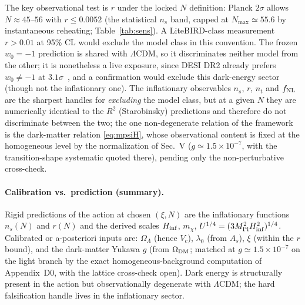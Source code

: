 \documentclass[pdflatex,sn-mathphys-num]{sn-jnl}
\newcommand{\MP}{M_{\rm Pl}}
\theoremstyle{thmstyleone}
\begin{document}
The key observational test is $r$ under the locked $N$ definition: Planck $2\sigma$ allows $N\approx45$--$56$ with $r\leq0.0052$ (the statistical $n_s$ band, capped at $N_{\max}\simeq55.6$ by instantaneous reheating; Table~\ref{tab:sens}). A LiteBIRD-class measurement $r>0.01$ at 95\% CL would exclude the model class in this convention. The frozen $w_0=-1$ prediction is shared with $\Lambda$CDM, so it discriminates neither model from the other; it is nonetheless a live exposure, since DESI DR2 already prefers $w_0\neq-1$ at $3.1\sigma$~\cite{DESI2025}, and a confirmation would exclude this dark-energy sector (though not the inflationary one). The inflationary observables $n_s$, $r$, $n_t$ and $f_{\rm NL}$ are the sharpest handles for \emph{excluding} the model class, but at a given $N$ they are numerically identical to the $R^2$ (Starobinsky) predictions and therefore do not discriminate between the two; the one non-degenerate relation of the framework is the dark-matter relation \eqref{eq:mpsiH}, whose observational content is fixed at the homogeneous level by the normalization of Sec.~V ($g\simeq1.5\times10^{-7}$, with the transition-shape systematic quoted there), pending only the non-perturbative cross-check.

\paragraph{Calibration vs.\ prediction (summary).} Rigid predictions of the action at chosen $(\xi,N)$ are the inflationary functions $n_s(N)$ and $r(N)$ and the derived scales $H_{\rm inf}$, $m_\chi$, $U^{1/4}=(3\MP^2H_{\rm inf}^2)^{1/4}$. Calibrated or a-posteriori inputs are: $\Omega_\Lambda$ (hence $V_c$), $\lambda_0$ (from $A_s$), $\xi$ (within the $r$ bound), and the dark-matter Yukawa $g$ (from $\Omega_{\rm DM}$; matched at $g\simeq1.5\times10^{-7}$ on the light branch by the exact homogeneous-background computation of Appendix~D0, with the lattice cross-check open). Dark energy is structurally present in the action but observationally degenerate with $\Lambda$CDM; the hard falsification handle lives in the inflationary sector.
\end{document}
